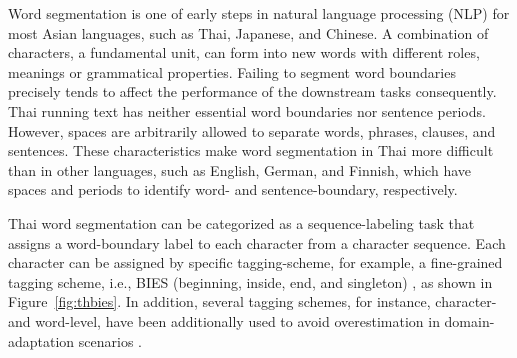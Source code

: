 Word segmentation is one of early steps in natural language processing (NLP) for most Asian languages, such as Thai, Japanese, and Chinese. 
%
A combination of characters, a fundamental unit, can form into new words with different roles, meanings or grammatical properties.
%
Failing to segment word boundaries precisely tends to affect the performance of the downstream tasks consequently.
%
Thai running text has neither essential word boundaries nor sentence periods.
%
However, spaces are arbitrarily allowed to separate words, phrases, clauses, and sentences.
%
These characteristics make word segmentation in Thai more difficult than in other languages, such as English, German, and Finnish, which have spaces and periods to identify word- and sentence-boundary, respectively.
%

Thai word segmentation can be categorized as a sequence-labeling task that assigns a word-boundary label to each character from a character sequence.
%
Each character can be assigned by specific tagging-scheme, for example, a fine-grained tagging scheme, i.e., BIES (beginning, inside, end, and singleton) \cite{Xue2003}, as shown in Figure~\ref{fig:thbies}.
%
In addition, several tagging schemes, for instance, character- and word-level, have been additionally used to avoid overestimation in domain-adaptation scenarios  \cite{limkonchotiwat-etal-2020-domain,limkonchotiwat-etal-2021-handling}.
